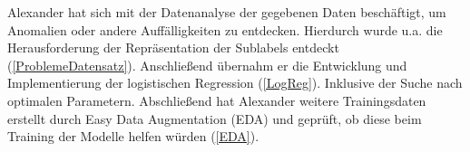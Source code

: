 Alexander hat sich mit der Datenanalyse der gegebenen Daten beschäftigt, um Anomalien oder andere Auffälligkeiten zu entdecken. Hierdurch wurde u.a. die Herausforderung der Repräsentation der Sublabels entdeckt  (\ref{ProblemeDatensatz}). Anschließend übernahm er die Entwicklung und Implementierung der logistischen Regression (\ref{LogReg}). Inklusive der Suche nach optimalen Parametern. Abschließend hat Alexander weitere Trainingsdaten erstellt durch Easy Data Augmentation (EDA) und geprüft, ob diese beim Training der Modelle helfen würden (\ref{EDA}). 